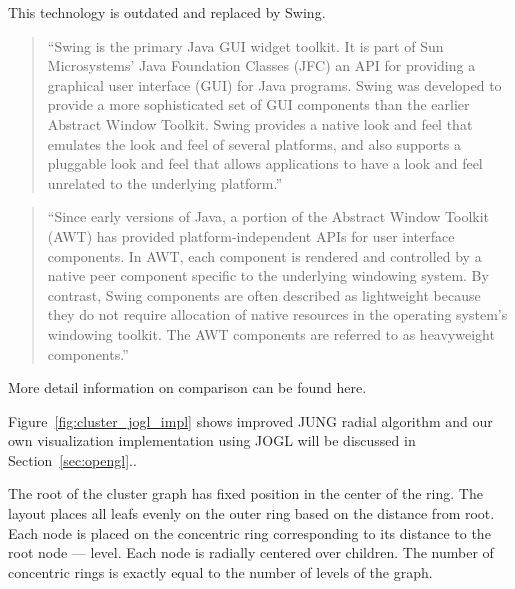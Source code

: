 This technology is outdated and replaced by Swing.

\begin{quotation}
``Swing is the primary Java GUI widget toolkit. It is part of Sun Microsystems' Java Foundation Classes (JFC)
an API for providing a graphical user interface (GUI) for Java programs.
Swing was developed to provide a more sophisticated set of GUI components than the earlier Abstract Window Toolkit.
Swing provides a native look and feel that emulates the look and feel of several platforms,
and also supports a pluggable look and feel that allows applications to have a look and feel unrelated to the underlying platform.''~\cite{JAVA_SWING}
\end{quotation}

\begin{quotation}
``Since early versions of Java, a portion of the Abstract Window Toolkit (AWT) has provided platform-independent APIs for user interface components.
In AWT, each component is rendered and controlled by a native peer component specific to the underlying windowing system.
By contrast, Swing components are often described as lightweight because they do not require allocation of native resources in the operating system's windowing toolkit.
The AWT components are referred to as heavyweight components.''~\cite{JAVA_SWING}
\end{quotation}

More detail information on comparison can be found here.~\cite{AWT_VS_SWING}


Figure~\ref{fig:cluster_jogl_impl} shows improved JUNG radial algorithm and our own visualization implementation using JOGL will be discussed in Section~\ref{sec:opengl}..

The root of the cluster graph has fixed position in the center of the ring. The layout places all leafs evenly on the outer ring based on the distance from root.
Each node is placed on the concentric ring corresponding to its distance to the root node --- level. Each node is radially centered over children.
The number of concentric rings is exactly equal to the number of levels of the graph.


